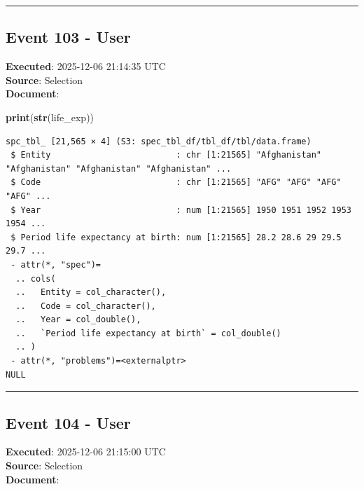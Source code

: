 \documentclass[
  11pt,
]{article}
\newenvironment{Shaded}{\begin{snugshade}}{\end{snugshade}}
\newcommand{\FunctionTok}[1]{\textcolor[rgb]{0.13,0.29,0.53}{\textbf{#1}}}
\newcommand{\NormalTok}[1]{#1}
\newenvironment{rpoutput}{\vspace{0.5em}\begin{snugshade}}{\end{snugshade}}
\begin{document}
\begin{center}\rule{0.5\linewidth}{0.5pt}\end{center}

\subsection{Event 103 - User}\label{event-103---user}

\textbf{Executed}: 2025-12-06 21:14:35 UTC\\
\textbf{Source}: Selection\\
\textbf{Document}:

\begin{Shaded}
\begin{Highlighting}[]
\FunctionTok{print}\NormalTok{(}\FunctionTok{str}\NormalTok{(life\_exp))}
\end{Highlighting}
\end{Shaded}

\begin{rpoutput}

\begin{verbatim}
spc_tbl_ [21,565 × 4] (S3: spec_tbl_df/tbl_df/tbl/data.frame)
 $ Entity                         : chr [1:21565] "Afghanistan" "Afghanistan" "Afghanistan" "Afghanistan" ...
 $ Code                           : chr [1:21565] "AFG" "AFG" "AFG" "AFG" ...
 $ Year                           : num [1:21565] 1950 1951 1952 1953 1954 ...
 $ Period life expectancy at birth: num [1:21565] 28.2 28.6 29 29.5 29.7 ...
 - attr(*, "spec")=
  .. cols(
  ..   Entity = col_character(),
  ..   Code = col_character(),
  ..   Year = col_double(),
  ..   `Period life expectancy at birth` = col_double()
  .. )
 - attr(*, "problems")=<externalptr> 
NULL
\end{verbatim}

\end{rpoutput}

\begin{center}\rule{0.5\linewidth}{0.5pt}\end{center}

\subsection{Event 104 - User}\label{event-104---user}

\textbf{Executed}: 2025-12-06 21:15:00 UTC\\
\textbf{Source}: Selection\\
\textbf{Document}:
\end{document}
